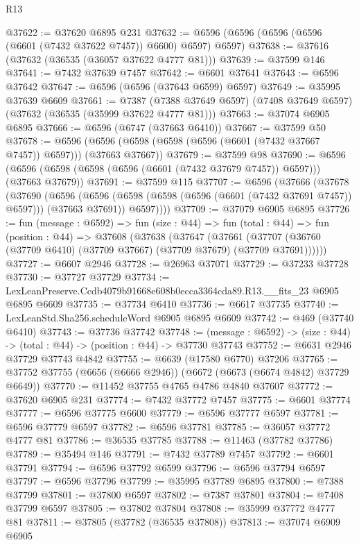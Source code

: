 \begin{lexlean}{R13}
\begin{coremodule}
@37622 := @37620 @6895 @231
@37632 := @6596 (@6596 (@6596 (@6596 (@6601 (@7432 @37622 @7457)) @6600) @6597) @6597)
@37638 := @37616 (@37632 (@36535 (@36057 @37622 @4777 @81)))
@37639 := @37599 @146
@37641 := @7432 @37639 @7457
@37642 := @6601 @37641
@37643 := @6596 @37642
@37647 := @6596 (@6596 (@37643 @6599) @6597)
@37649 := @35995 @37639 @6609
@37661 := @7387
    (@7388 @37649 @6597)
    (@7408 @37649 @6597)
    (@37632 (@36535 (@35999 @37622 @4777 @81)))
@37663 := @37074 @6905 @6895
@37666 := @6596 (@6747 (@37663 @6410))
@37667 := @37599 @50
@37678 := @6596 (@6596 (@6598 (@6598 (@6596 (@6601 (@7432 @37667 @7457)) @6597))) (@37663 @37667))
@37679 := @37599 @98
@37690 := @6596 (@6596 (@6598 (@6598 (@6596 (@6601 (@7432 @37679 @7457)) @6597))) (@37663 @37679))
@37691 := @37599 @115
@37707 := @6596
    (@37666
      (@37678
        (@37690
          (@6596
            (@6596 (@6598 (@6598 (@6596 (@6601 (@7432 @37691 @7457)) @6597))) (@37663 @37691))
            @6597))))
@37709 := @37079 @6905 @6895
@37726 := fun (message : @6592) =>
  fun (size : @44) =>
  fun (total : @44) =>
  fun (position : @44) =>
  @37608
    (@37638
      (@37647
        (@37661 (@37707 (@36760 (@37709 @6410) (@37709 @37667) (@37709 @37679) (@37709 @37691))))))
@37727 := @6607 @2946
@37728 := @26963 @37071
@37729 := @37233 @37728
@37730 := @37727 @37729
@37734 := LexLeanPreserve.Ccdb4079b91668e608b0ecca3364cda89.R13.__fits_23 @6905 @6895 @6609
@37735 := @37734 @6410
@37736 := @6617 @37735
@37740 := LexLeanStd.Sha256.scheduleWord @6905 @6895 @6609
@37742 := @469 (@37740 @6410)
@37743 := @37736 @37742
@37748 := (message : @6592) -> (size : @44) -> (total : @44) -> (position : @44) -> @37730 @37743
@37752 := @6631 @2946 @37729 @37743 @4842
@37755 := @6639 (@17580 @6770) @37206
@37765 := @37752 @37755 (@6656 (@6666 @2946)) (@6672 (@6673 (@6674 @4842) @37729 @6649))
@37770 := @11452 @37755 @4765 @4786 @4840 @37607
@37772 := @37620 @6905 @231
@37774 := @7432 @37772 @7457
@37775 := @6601 @37774
@37777 := @6596 @37775 @6600
@37779 := @6596 @37777 @6597
@37781 := @6596 @37779 @6597
@37782 := @6596 @37781
@37785 := @36057 @37772 @4777 @81
@37786 := @36535 @37785
@37788 := @11463 (@37782 @37786)
@37789 := @35494 @146
@37791 := @7432 @37789 @7457
@37792 := @6601 @37791
@37794 := @6596 @37792 @6599
@37796 := @6596 @37794 @6597
@37797 := @6596 @37796
@37799 := @35995 @37789 @6895
@37800 := @7388 @37799
@37801 := @37800 @6597
@37802 := @7387 @37801
@37804 := @7408 @37799 @6597
@37805 := @37802 @37804
@37808 := @35999 @37772 @4777 @81
@37811 := @37805 (@37782 (@36535 @37808))
@37813 := @37074 @6909 @6905

\end{coremodule}
\end{lexlean}
